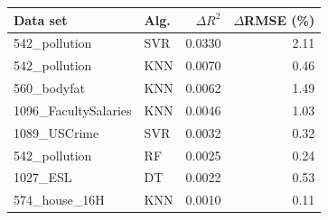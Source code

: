\begin{tabular}{llrr}
\toprule
\textbf{Data set} & \textbf{Alg.} & \textbf{$\Delta R^2$} & \textbf{$\Delta$RMSE (\%)} \\
\midrule
542\_pollution & SVR & 0.0330 & 2.11 \\
542\_pollution & KNN & 0.0070 & 0.46 \\
560\_bodyfat & KNN & 0.0062 & 1.49 \\
1096\_FacultySalaries & KNN & 0.0046 & 1.03 \\
1089\_USCrime & SVR & 0.0032 & 0.32 \\
542\_pollution & RF & 0.0025 & 0.24 \\
1027\_ESL & DT & 0.0022 & 0.53 \\
574\_house\_16H & KNN & 0.0010 & 0.11 \\
\bottomrule
\end{tabular}
